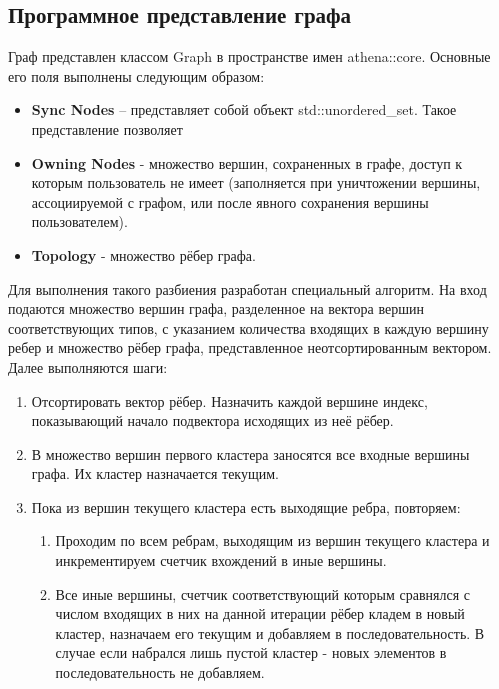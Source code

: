 \subsection{Программное представление графа}
\label{sec:softwarepresentationgraph}

Граф представлен классом Graph в пространстве имен athena::core. Основные его поля выполнены следующим образом:
\begin{itemize}
    \item \textbf{Sync Nodes} -- представляет собой объект std::unordered\_set. Такое представление позволяет 
    \item \textbf{Owning Nodes} - множество вершин, сохраненных в графе, доступ к которым пользователь не имеет (заполняется при уничтожении вершины, ассоциируемой с графом, или после явного сохранения вершины пользователем).
    \item \textbf{Topology} - множество рёбер графа.
\end{itemize}


Для выполнения такого разбиения разработан специальный алгоритм. На вход подаются
множество вершин графа, разделенное на вектора вершин соответствующих типов, с указанием количества входящих в каждую
вершину ребер и множество рёбер графа, представленное неотсортированным вектором.
Далее выполняются шаги:
\begin{enumerate}
    \item Отсортировать вектор рёбер. Назначить каждой вершине индекс, показывающий начало подвектора исходящих из неё рёбер.
    \item В множество вершин первого кластера заносятся все входные вершины графа. Их кластер назначается текущим.
    \item Пока из вершин текущего кластера есть выходящие ребра, повторяем:
    \begin{enumerate}
        \item Проходим по всем ребрам, выходящим из вершин текущего кластера и инкрементируем счетчик вхождений в иные вершины.
        \item Все иные вершины, счетчик соответствующий которым сравнялся с числом входящих в них на данной итерации рёбер кладем в новый кластер, назначаем его текущим и добавляем в последовательность. В случае если набрался лишь пустой кластер - новых элементов в последовательность не добавляем.
    \end{enumerate}
\end{enumerate}
